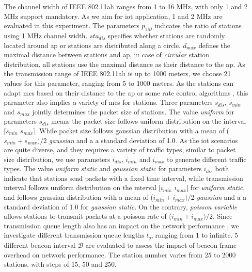 The channel width of IEEE 802.11ah ranges from 1 to  16 MHz, with only 1 and 2 MHz support mandatory. As we aim for \gls{iot} application, 1 and 2 MHz are evaluated in this experiment. The parameters $p_\textit{1M}$ indicates the ratio of stations using 1 MHz channel width. $sta_\textit{dis}$ specifies whether stations are randomly located around \gls{ap} or stations are distributed along a circle. $d_\textit{max}$ defines the maximal distance between stations and \gls{ap}, in case of \textit{circular} station distribution, all stations use the maximal distance as their distance to the \gls{ap}. As the transmission range of IEEE 802.11ah is up to 1000 meters, we choose 21 values for this parameter, ranging from 5 to 1000 meters. As the stations can adapt \gls{mcs} based on their distance to the \gls{ap} or some rate control algorithms \cite{rca2006}, this parameter also implies a variety of \gls{mcs} for stations. Three parameters $s_\textit{dis}$, $s_\textit{min}$ and $s_\textit{max}$ jointly determines the packet size of stations. The value \textit{uniform} for parameters $s_\textit{dis}$ means the packet size follows uniform distribution on the interval [$s_\textit{min}$  $s_\textit{max}$]. While packet size follows gaussian distribution with a mean of ($s_\textit{min} + s_\textit{max}) / 2 $ \textit{gaussian} and a a standard deviation of 1.0. As the \gls{iot} scenarios are quite diverse, and they requires a variety of traffic types, similar to packet size distribution, we use parameters $i_\textit{dis}$, $i_\textit{min}$  and $i_\textit{max}$ to generate different traffic types. The value \textit{uniform static} and \textit{gaussian static} for parameters $i_\textit{dis}$ both indicate that stations send packets with a fixed time interval, while transmission interval follows uniform distribution on the interval [$i_\textit{min}$  $i_\textit{max}$] for \textit{uniform static}, and follows  gaussian distribution with a mean of ($i_\textit{min} + i_\textit{max})/ 2 $ \textit{gaussian} and a a standard deviation of 1.0 for \textit{gaussian static}. On the contrary, \textit{poisson variable} allows stations to transmit packets at a poisson rate of ($i_\textit{min} + i_\textit{max}) / 2 $. Since transmission queue length also has an impact on the network performance \cite{Duffy2007}, we investigate different transmission queue lengths $l_q$, ranging from 1 to infinite. 5 different beacon interval $\mathcal{B}$ are evaluated to assess the impact of beacon frame overhead on network performance. The station number varies from 25 to 2000 stations, with steps of 15, 50 and 250. %

